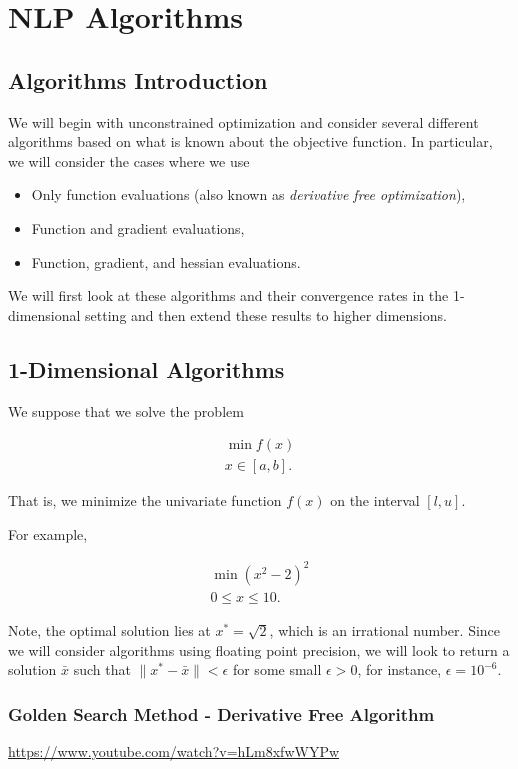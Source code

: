 \documentclass[../open-optimization/open-optimization.tex]{subfiles}
\begin{document}
\chapter{NLP Algorithms}


\section{Algorithms Introduction}

We will begin with unconstrained optimization and consider several different algorithms based on what is known about the objective function.  In particular, we will consider the cases where we use
\begin{itemize}
\item Only function evaluations (also known as \emph{derivative free optimization}),
\item Function and gradient evaluations,
\item Function, gradient, and hessian evaluations.
\end{itemize}

We will first look at these algorithms and their convergence rates in the 1-dimensional setting and then extend these results to higher dimensions.

\section{1-Dimensional Algorithms}
We suppose that we solve the problem 

\begin{align}
\min f(x)\\
x \in [a,b].
\end{align}

That is, we minimize the univariate function $f(x)$ on the interval $[l,u]$.  

For example, 

\begin{align}
\min (x^2 - 2)^2\\
 0 \leq x \leq 10.
\end{align}

Note, the optimal solution lies at $x^* = \sqrt{2}$, which is an irrational number.  Since we will consider algorithms using floating point precision, we will look to return a solution $\bar x$ such that $\|x^* - \bar x\| < \epsilon$ for some small $\epsilon > 0$, for instance, $\epsilon = 10^{-6}$.


\subsection{Golden Search Method - Derivative Free Algorithm}
\url{https://www.youtube.com/watch?v=hLm8xfwWYPw}
\end{document}
